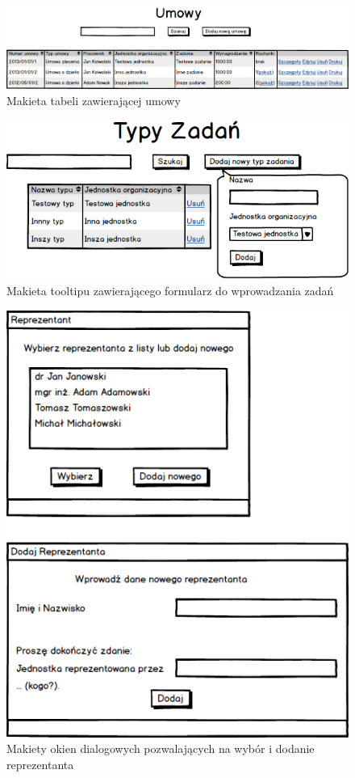\begin{figure}[tdh]
    \begin{center}
	\includegraphics[scale=0.6,angle=-90 ]{img/mockup2.png}
	\caption{Makieta tabeli zawierającej umowy}
	\label{makieta}
    \end{center}
\end{figure}

\begin{figure}[tdh]
    \begin{center}
	\includegraphics[scale=.6 ]{img/mockup3.png}
	\caption{Makieta tooltipu zawierającego formularz do wprowadzania zadań}
	\label{makieta}
    \end{center}
\end{figure}

\begin{figure}[tdh]
    \begin{center}
	\includegraphics[scale=.6 ]{img/mockup4.png}
	\caption{Makiety okien dialogowych pozwalających na wybór i dodanie reprezentanta}
	\label{makieta}
    \end{center}
\end{figure}
